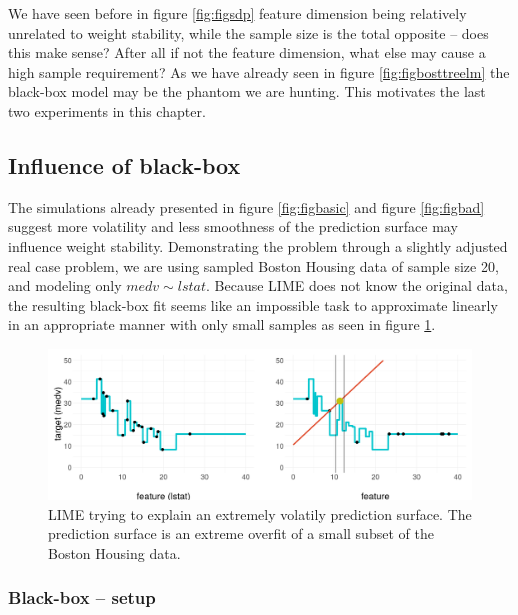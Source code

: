 \documentclass[
]{krantz}
\begin{document}
We have seen before in figure \ref{fig:figsdp} feature dimension being relatively unrelated to weight stability, while the sample size is the total opposite -- does this make sense?
After all if not the feature dimension, what else may cause a high sample requirement?
As we have already seen in figure \ref{fig:figbosttreelm} the black-box model may be the phantom we are hunting.
This motivates the last two experiments in this chapter.

\hypertarget{influence-of-black-box}{%
\subsection{Influence of black-box}\label{influence-of-black-box}}

The simulations already presented in figure \ref{fig:figbasic} and figure \ref{fig:figbad} suggest more volatility and less smoothness of the prediction surface may influence weight stability.
Demonstrating the problem through a slightly adjusted real case problem, we are using sampled Boston Housing data of sample size 20, and modeling only \(medv \sim lstat\).
Because LIME does not know the original data, the resulting black-box fit seems like an impossible task to approximate linearly in an appropriate manner with only small samples as seen in figure \ref{fig:figverybad}.

\begin{figure}

{\centering \includegraphics[width=19.44in]{images/boston_sampled_tree_presi3} 

}

\caption{LIME trying to explain an extremely volatily prediction surface. The prediction surface is an extreme overfit of a small subset of the Boston Housing data.}\label{fig:figverybad}
\end{figure}

\hypertarget{black-box-setup}{%
\subsubsection{Black-box -- setup}\label{black-box-setup}}
\end{document}
